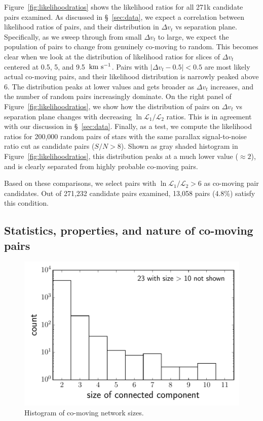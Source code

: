 \documentclass[manuscript, letterpaper]{aastex6}
\newcommand{\kms}{\ensuremath{\rm km~s^{-1}}}
\begin{document}
Figure~\ref{fig:likelihoodratios} shows the likelihood ratios for all
271k candidate pairs examined.
As discussed in \S~\ref{sec:data}, we expect a correlation between likelihood
ratios of pairs, and their distribution in $\Delta v_t$ vs separation plane.
Specifically, as we sweep through from small $\Delta v_t$ to large, we expect
the population of pairs to change from genuinely co-moving to random.
This becomes clear when we look at the distribution of likelihood ratios for
slices of $\Delta v_t$ centered at 0.5, 5, and 9.5~\kms.
Pairs with $|\Delta v_t-0.5|<0.5$ are most likely actual co-moving pairs, and
their likelihood distribution is narrowly peaked above 6.
The distribution peaks at lower values and gets broader as $\Delta v_t$ increases,
and the number of random pairs increasingly dominate.
On the right panel of Figure~\ref{fig:likelihoodratios}, we show
how the distribution of pairs on $\Delta v_t$ vs separation plane changes
with decreasing $\ln \mathcal{L}_1 /\mathcal{L}_2$ ratios.
This is in agreement with our discussion in \S~\ref{sec:data}.
Finally, as a test,
we compute the likelihood ratios for 200,000 random pairs of stars with the same
parallax signal-to-noise ratio cut as candidate pairs ($S/N > 8$).
Shown as gray shaded histogram in Figure~\ref{fig:likelihoodratios},
this distribution peaks at a much lower value ($\approx 2$),
and is clearly separated from highly probable co-moving pairs.

Based on these comparisons, we select pairs with
$\ln \mathcal{L}_1 /\mathcal{L}_2 > 6$ as co-moving pair candidates.
Out of 271,232 candidate pairs examined, 13,058 pairs (4.8\%)
satisfy this condition.

\subsection{Statistics, properties, and nature of co-moving pairs}

\begin{figure}[htbp]
  \begin{center}
    \includegraphics[width=\textwidth]{figures/dist_networksize.pdf}
  \end{center}
  \caption{%
    Histogram of co-moving network sizes.
    \label{fig:hist_Nneighbors}}
\end{figure}
\end{document}
